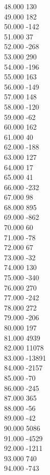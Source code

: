{ 48.000	130 \\
 49.000	182 \\
 50.000	-142 \\
 51.000	37 \\
 52.000	-268 \\
 53.000	290 \\
 54.000	-196 \\
 55.000	163 \\
 56.000	-149 \\
 57.000	148 \\
 58.000	-120 \\
 59.000	-62 \\
 60.000	162 \\
 61.000	40 \\
 62.000	-188 \\
 63.000	127 \\
 64.000	17 \\
 65.000	41 \\
 66.000	-232 \\
 67.000	98 \\
 68.000	895 \\
 69.000	-862 \\
 70.000	60 \\
 71.000	-78 \\
 72.000	67 \\
 73.000	-32 \\
 74.000	130 \\
 75.000	-340 \\
 76.000	270 \\
 77.000	-242 \\
 78.000	272 \\
 79.000	-206 \\
 80.000	197 \\
 81.000	4939 \\
 82.000	11078 \\
 83.000	-13891 \\
 84.000	-2157 \\
 85.000	-70 \\
 86.000	-245 \\
 87.000	365 \\
 88.000	-56 \\
 89.000	-42 \\
 90.000	5086 \\
 91.000	-4529 \\
 92.000	-1211 \\
 93.000	740 \\
 94.000	-743 \\
}
